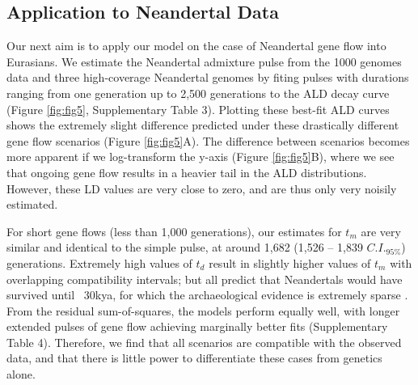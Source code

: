 \documentclass[11pt]{article}
\begin{document}
\subsection{Application to Neandertal Data}
Our next aim is to apply our model on the case of Neandertal gene flow into Eurasians. We estimate the Neandertal admixture pulse from the 1000 genomes data \citep{the_1000_genomes_project_consortium_global_2015} and three high-coverage Neandertal genomes \citep{prufer_complete_2013, prufer_high-coverage_2017, mafessoni_high_coverage_2020} by fiting pulses with durations ranging from one generation up to 2,500 generations to the ALD decay curve (Figure \ref{fig:fig5}, Supplementary Table 3). Plotting these best-fit ALD curves shows the extremely slight difference predicted under these drastically different gene flow scenarios (Figure \ref{fig:fig5}A). The difference between scenarios becomes more apparent if we log-transform the y-axis (Figure \ref{fig:fig5}B), where we see that ongoing gene flow results in a heavier tail in the ALD distributions. However, these LD values are very close to zero, and are thus only very noisily estimated. 

For short gene flows (less than 1,000 generations), our estimates for $t_m$ are very similar and identical to the simple pulse, at around 1,682 (1,526 -- 1,839 $C.I._{95\%}$) generations. Extremely high values of $t_d$ result in slightly higher values of $t_m$ with overlapping compatibility intervals; but all predict that Neandertals would have survived until ~30kya, for which the archaeological evidence is extremely sparse \citep{hublin_last_2017}.  From the residual sum-of-squares, the models perform equally well, with longer extended pulses of gene flow achieving marginally better fits (Supplementary Table 4). Therefore, we find that all scenarios are compatible with the observed data, and that there is little power to differentiate these cases from genetics alone.  
\end{document}
